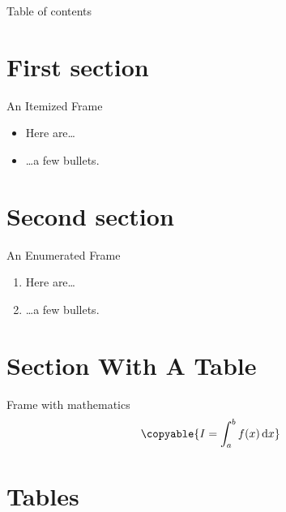 \documentclass[tikz, aspectratio=169]{beamer}
\begin{document}
\begin{frame}
\titlepage
\end{frame}

\begin{frame}{Table of contents}
\tableofcontents
\end{frame}

\section{First section}

\begin{frame}{An Itemized Frame}
\begin{itemize}
\item Here are\ldots
\item \ldots a few bullets.
\end{itemize}
\end{frame}

\section{Second section}

\begin{frame}{An Enumerated Frame}
\begin{enumerate}
\item Here are\ldots
\item \ldots a few bullets.
\end{enumerate}
\end{frame}

\section{Section With A Table}

\begin{frame}{Frame with mathematics}
\begin{equation}
\copyable{
  I = \int_a^b f(x) \,\mathrm d x
}
\end{equation}
\end{frame}

\section{Tables}
\end{document}

